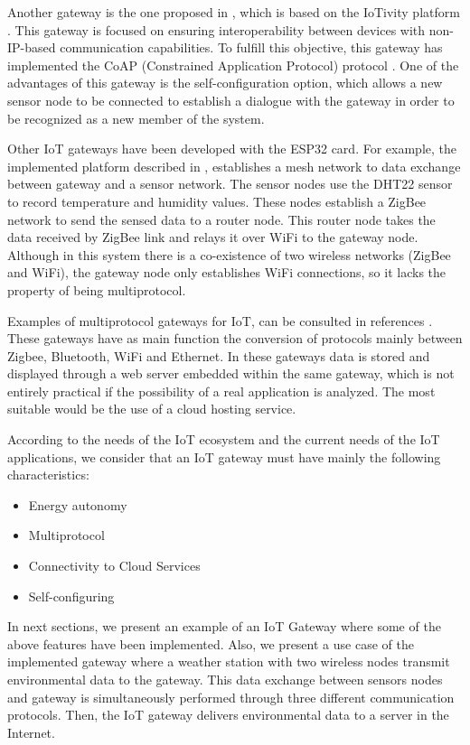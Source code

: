 Another gateway is the one proposed in \cite{Kang2018}, which is based on the IoTivity platform \cite{LinuxFoundation2019}. This gateway is focused on ensuring interoperability between devices with non-IP-based communication capabilities. To fulfill this objective, this gateway has implemented the CoAP (Constrained Application Protocol) protocol \cite{Shelby2014}. One of the advantages of this gateway is the self-configuration option, which allows a new sensor node to be connected to establish a dialogue with the gateway in order to be recognized as a new member of the system.

Other IoT gateways have been developed with the ESP32 card. For example, the implemented platform described in \cite{Khanchuea2019}, establishes a mesh network to data exchange between gateway and a sensor network. The sensor nodes use the DHT22 sensor to record temperature and humidity values. These nodes establish a ZigBee network to send the sensed data to a router node. This router node takes the data received by ZigBee link and relays it over WiFi to the gateway node. Although in this system there is a co-existence of two wireless networks (ZigBee and WiFi), the gateway node only establishes WiFi connections, so it lacks the property of being multiprotocol. 

Examples of multiprotocol gateways for IoT, can be consulted in references \cite{Guoqiang2013,YacchiremaVargas2016}. These gateways have as main function the conversion of protocols mainly between Zigbee, Bluetooth, WiFi and Ethernet. In these gateways data is stored and displayed through a web server embedded within the same gateway, which is not entirely practical if the possibility of a real application is analyzed. The most suitable would be the use of a cloud hosting service. 

According to the needs of the IoT ecosystem and the current needs of the IoT applications, we consider that an IoT gateway must have mainly the following characteristics:

\begin{itemize}
	\item Energy autonomy
	\item Multiprotocol
	\item Connectivity to Cloud Services
	\item Self-configuring
\end{itemize}

In next sections, we present an example of an IoT Gateway where some of the above features have been implemented. Also, we present a use case of the implemented gateway where a weather station with two wireless nodes transmit environmental data to the gateway. This data exchange between sensors nodes and gateway is simultaneously performed through three different communication protocols. Then, the IoT gateway delivers environmental data to a server in the Internet.

